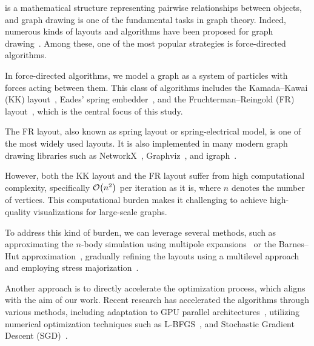 \documentclass[dvipdfmx,10pt,journal,compsoc]{IEEEtran}
\begin{document}
 is a mathematical structure representing pairwise relationships between objects, and graph drawing is one of the fundamental tasks in graph theory.
Indeed, numerous kinds of layouts and algorithms have been proposed for graph drawing~\cite{tutteHowDrawGraph1963,chrobakLineartimeAlgorithmDrawing1995,sugiyamaMethodsVisualUnderstanding1981,ghassemitoosiSimulatedAnnealingPreProcessing2016}.
Among these, one of the most popular strategies is force-directed algorithms.

In force-directed algorithms, we model a graph as a system of particles with forces acting between them.
This class of algorithms includes the Kamada--Kawai (KK) layout~\cite{kamadaAlgorithmDrawingGeneral1989},
Eades' spring embedder~\cite{eades1984heuristic}, and the Fruchterman--Reingold (FR) layout~\cite{fruchtermanGraphDrawingForcedirected1991,kobourovSpringEmbeddersForce2012}, which is the central focus of this study.

The FR layout, also known as spring layout or spring-electrical model, is one of the most widely used layouts.
It is also implemented in many modern graph drawing libraries such as NetworkX~\cite{hagberg2008exploring}, Graphviz~\cite{ellsonGraphvizOpenSource2002}, and igraph~\cite{csardiIgraphSoftwarePackage2006}.

However, both the KK layout and the FR layout suffer from high computational complexity, specifically $\order{n^2}$ per iteration as it is, where $n$ denotes the number of vertices.
This computational burden makes it challenging to achieve high-quality visualizations for large-scale graphs.

To address this kind of burden, we can leverage several methods, such as approximating the $n$-body simulation using multipole expansions~\cite{greengardFastAlgorithmParticle1987} or the Barnes--Hut approximation~\cite{barnesHierarchicalLogForcecalculation1986}, gradually refining the layouts using a multilevel approach~\cite{Hu2006EfficientHF} and employing stress majorization~\cite{gansnerGraphDrawingStress2005}.

Another approach is to directly accelerate the optimization process, which aligns with the aim of our work.
Recent research has accelerated the algorithms through various methods, including adaptation to GPU parallel architectures~\cite{gajdosParallelFruchtermanReingold2016}, utilizing numerical optimization techniques such as L-BFGS~\cite{6183577}, and Stochastic Gradient Descent (SGD)~\cite{8419285}.
\end{document}
